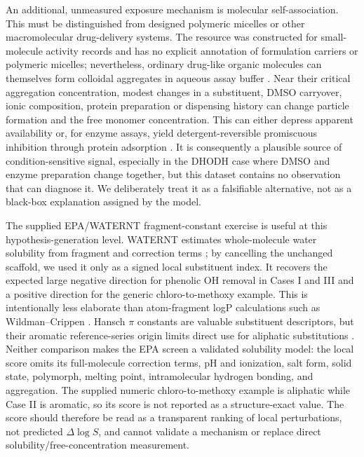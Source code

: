 \documentclass[letterpaper]{article}
\begin{document}
An additional, unmeasured exposure mechanism is molecular self-association. This must be distinguished from designed polymeric micelles or other macromolecular drug-delivery systems. The resource was constructed for small-molecule activity records and has no explicit annotation of formulation carriers or polymeric micelles; nevertheless, ordinary drug-like organic molecules can themselves form colloidal aggregates in aqueous assay buffer \citep{feng2018colloidal}. Near their critical aggregation concentration, modest changes in a substituent, DMSO carryover, ionic composition, protein preparation or dispensing history can change particle formation and the free monomer concentration. This can either depress apparent availability or, for enzyme assays, yield detergent-reversible promiscuous inhibition through protein adsorption \citep{mcgovern2002detergent}. It is consequently a plausible source of condition-sensitive signal, especially in the DHODH case where DMSO and enzyme preparation change together, but this dataset contains no observation that can diagnose it. We deliberately treat it as a falsifiable alternative, not as a black-box explanation assigned by the model.

The supplied EPA/WATERNT fragment-constant exercise is useful at this hypothesis-generation level. WATERNT estimates whole-molecule water solubility from fragment and correction terms \citep{epa_waternt}; by cancelling the unchanged scaffold, we used it only as a signed local substituent index. It recovers the expected large negative direction for phenolic OH removal in Cases I and III and a positive direction for the generic chloro-to-methoxy example. This is intentionally less elaborate than atom-fragment logP calculations such as Wildman--Crippen \citep{wildman1999prediction}. Hansch $\pi$ constants are valuable substituent descriptors, but their aromatic reference-series origin limits direct use for aliphatic substitutions \citep{hansch1979substituent}. Neither comparison makes the EPA screen a validated solubility model: the local score omits its full-molecule correction terms, pH and ionization, salt form, solid state, polymorph, melting point, intramolecular hydrogen bonding, and aggregation. The supplied numeric chloro-to-methoxy example is aliphatic while Case II is aromatic, so its score is not reported as a structure-exact value. The score should therefore be read as a transparent ranking of local perturbations, not predicted $\Delta\log S$, and cannot validate a mechanism or replace direct solubility/free-concentration measurement.
\end{document}
